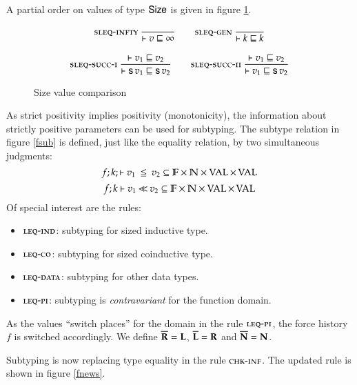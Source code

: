 A partial order on values of type $\mathsf{Size}$ is given in figure \ref{substage}. \begin{figure}[tp]
\begin{gather*}
\mbox{\sc sleq-infty}\ \dfrac{}{\vdash v\sqsubseteq\infty}
\qquad
\mbox{\sc sleq-gen}\ \dfrac{}{\vdash k\sqsubseteq k}
\\[2ex]
\mbox{\sc sleq-succ-i}\ \dfrac{\vdash v_1\sqsubseteq v_2}{\vdash\mathsf{s}\, v_1\sqsubseteq\mathsf{s}\, v_2}
\qquad
\mbox{\sc sleq-succ-ii}\ \dfrac{\vdash v_1\sqsubseteq v_2}{\vdash v_1\sqsubseteq\mathsf{s}\, v_2}
\end{gather*}
\caption{Size value comparison}
\label{substage}
\end{figure} As strict positivity implies positivity (monotonicity), the information about strictly positive parameters can be used for subtyping. The subtype relation in figure \ref{fsub} is defined, just like the equality relation, by two simultaneous judgments:
\[f;k;\vdash v_1\:\leqq\:v_2 \subseteq \mathbb{F} \times \mathbb{N} \times \operatorname{VAL} \times \operatorname{VAL} \]
\[f;k\vdash v_1{\:\ll\:}v_2 \subseteq \mathbb{F} \times \mathbb{N} \times\operatorname{VAL} \times \operatorname{VAL} \]
Of special interest are the rules:
\begin{itemize}
\item
$\mbox{\sc leq-ind}$: subtyping for sized inductive type. 
\item
$\mbox{\sc leq-co}$: subtyping for sized coinductive type.
\item
$\mbox{\sc leq-data}$: subtyping for other data types.
\item
$\mbox{\sc leq-pi}$: subtyping is \emph{contravariant} for the function domain. 
\end{itemize}
As the values ``switch places'' for the domain in the rule $\mbox{\sc leq-pi}$, the force history $f$ is switched accordingly.
We define $\overline{\mathbf{R}}=\mathbf{L}$,  $\overline{\mathbf{L}}=\mathbf{R}$ and $\overline{\mathbf{N}}=\mathbf{N}$.

Subtyping is now replacing type equality in the rule $\mbox{\sc chk-inf}$. 
The updated rule is shown in figure \ref{fnews}.


